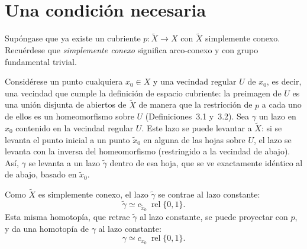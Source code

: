 \documentclass[11pt]{article}
\begin{document}
\section*{Una condición necesaria}

Supóngase que ya existe un cubriente $p\colon\tilde X\to X$ con $\tilde X$ simplemente conexo. Recuérdese que \emph{simplemente conexo} significa arco-conexo y con grupo fundamental trivial.

Considérese un punto cualquiera $x_0\in X$ y una vecindad regular $U$ de $x_0$, es decir, una vecindad que cumple la definición de espacio cubriente: la preimagen de $U$ es una unión disjunta de abiertos de $\tilde X$ de manera que la restricción de $p$ a cada uno de ellos es un homeomorfismo sobre $U$ (Definiciones~3.1 y~3.2). Sea $\gamma$ un lazo en $x_0$ contenido en la vecindad regular $U$. Este lazo se puede levantar a $\tilde X$: si se levanta el punto inicial a un punto $\tilde x_0$ en alguna de las hojas sobre $U$, el lazo se levanta con la inversa del homeomorfismo (restringido a la vecindad de abajo). Así, $\gamma$ se levanta a un lazo $\tilde\gamma$ dentro de esa hoja, que se ve exactamente idéntico al de abajo, basado en $\tilde x_0$.

Como $\tilde X$ es simplemente conexo, el lazo $\tilde\gamma$ se contrae al lazo constante:
\[
  \tilde\gamma\simeq c_{\tilde x_0}\ \operatorname{rel}\{0,1\}.
\]
Esta misma homotopía, que retrae $\tilde\gamma$ al lazo constante, se puede proyectar con $p$, y da una homotopía de $\gamma$ al lazo constante:
\[
  \gamma\simeq c_{x_0}\ \operatorname{rel}\{0,1\}.
\]

\begin{center}
\end{center}
\end{document}
